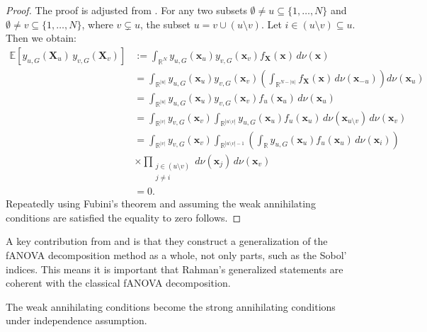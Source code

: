 \begin{proof}
The proof is adjusted from \cite{rahman2014}. For any two subsets $\emptyset \ne u \subseteq \{1,\dots,N\}$ and $\emptyset \ne v \subseteq \{1,\dots,N\}$, where $v \subsetneq u$, the subset $u = v \cup (u \setminus v)$. Let $i \in (u \setminus v) \subseteq u$. Then we obtain:
\begin{align*}
\mathbb{E}[y_{u,G}(\boldsymbol{X}_u) \, y_{v,G}(\boldsymbol{X}_v)]
&:= \int_{\mathbb{R}^N} y_{u,G}(\boldsymbol{x}_u) y_{v,G}(\boldsymbol{x}_v) f_{\boldsymbol{X}}(\boldsymbol{x}) \, d \nu(\boldsymbol{x}) \\[0.5em]
&= \int_{\mathbb{R}^{|u|}} y_{u,G}(\boldsymbol{x}_u) y_{v,G}(\boldsymbol{x}_v) \left( \int_{\mathbb{R}^{N - |u|}} f_{\boldsymbol{X}}(\boldsymbol{x}) \, d \nu(\boldsymbol{x}_{-u}) \right) d \nu(\boldsymbol{x}_u) \\[0.5em]
&= \int_{\mathbb{R}^{|u|}} y_{u,G}(\boldsymbol{x}_u) y_{v,G}(\boldsymbol{x}_v) f_u(\boldsymbol{x}_u) \, d \nu(\boldsymbol{x}_u) \\[0.5em]
&= \int_{\mathbb{R}^{|v|}} y_{v,G}(\boldsymbol{x}_v)
    \int_{\mathbb{R}^{|u \setminus v|}} y_{u,G}(\boldsymbol{x}_u) f_u(\boldsymbol{x}_u) \, d \nu(\boldsymbol{x}_{u \setminus v}) \, d \nu(\boldsymbol{x}_v) \\[0.5em]
&= \int_{\mathbb{R}^{|v|}} y_{v,G}(\boldsymbol{x}_v)
    \int_{\mathbb{R}^{|u \setminus v| - 1}} \left( \int_{\mathbb{R}} y_{u,G}(\boldsymbol{x}_u) f_u(\boldsymbol{x}_u) \, d \nu(\boldsymbol{x}_i) \right) \\[0.5em]
&\times \prod_{\substack{j \in (u \setminus v) \\ j \ne i}} d \nu(\boldsymbol{x}_j) \, d \nu(\boldsymbol{x}_v) \\[0.5em]
&= 0.
\end{align*}
Repeatedly using Fubini's theorem and assuming the weak annihilating conditions are satisfied the equality to zero follows.
\end{proof}

A key contribution from \cite{hooker2007} and \cite{rahman2014} is that they construct a generalization of the fANOVA decomposition method as a whole, not only parts, such as the Sobol' indices.
This means it is important that Rahman's generalized statements are coherent with the classical fANOVA decomposition.
\begin{proposition}
    The weak annihilating conditions become the strong annihilating conditions under independence assumption.
    \label{prop:weak_strong}
\end{proposition}

